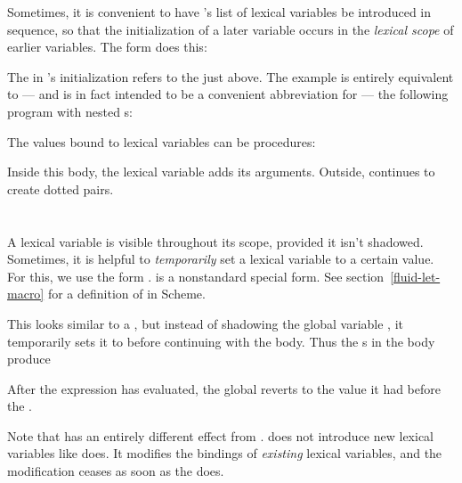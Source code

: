 Sometimes, it is convenient to have ’s list of
lexical variables be introduced in sequence, so that
the initialization of a later variable occurs in the
{\em lexical scope} of earlier variables.   The form
 does this:


\n The  in ’s initialization refers to the 
just above.  The example is entirely equivalent to —
and is in fact intended to be a convenient abbreviation
for — the following program with nested s:


The values bound to lexical variables can be
procedures:


\n Inside this  body, the lexical variable 
adds its arguments.   Outside,  continues to
create dotted pairs.


\section{}
\label{fluid-let}

A lexical variable is visible throughout its scope,
provided it isn’t shadowed.  Sometimes, it is helpful
to {\em temporarily} set a lexical variable to a
certain value.  For this, we use the form
.\f{ is a nonstandard special
form.  See section~\ref{fluid-let-macro} for a definition
of  in Scheme.}


\n
This looks similar to a , but instead of
shadowing the global variable , it
temporarily sets it to  before continuing with
the
 body.  Thus the s in the body
produce


\n After the  expression has evaluated,
the global  reverts to the value it had
before the .


Note that  has an entirely different
effect from .   does not introduce
new lexical variables like  does.  It modifies
the bindings of {\em existing} lexical variables, and
the modification ceases as soon as the  does.

